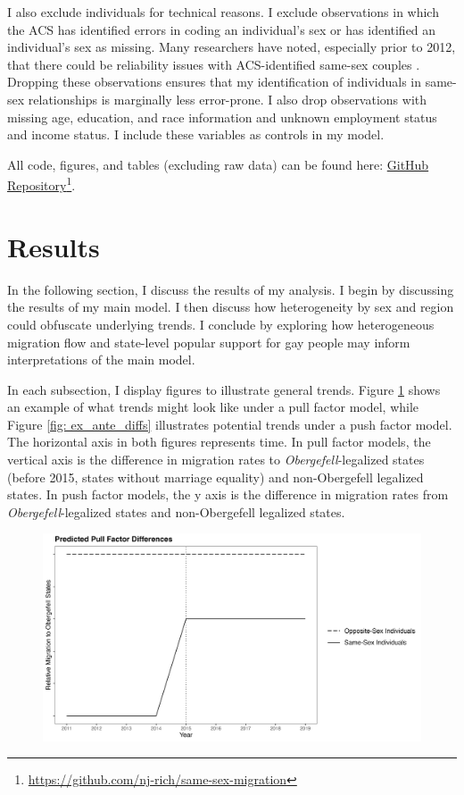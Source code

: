 \documentclass[12pt,letterpaper]{article}
\begin{document}
I also exclude individuals for technical reasons. I exclude observations in which the ACS has identified errors in coding an individual’s sex or has identified an individual’s sex as missing. Many researchers have noted, especially prior to 2012, that there could be reliability issues with ACS-identified same-sex couples \citep{3, 5, 7, 12}. Dropping these observations ensures that my identification of individuals in same-sex relationships is marginally less error-prone. I also drop observations with missing age, education, and race information and unknown employment status and income status. I include these variables as controls in my model.

All code, figures, and tables (excluding raw data) can be found here: \href{https://github.com/nj-rich/same-sex-migration}{GitHub Repository}\footnote{\url{https://github.com/nj-rich/same-sex-migration}}.

\FloatBarrier
\section{Results}
In the following section, I discuss the results of my analysis. I begin by discussing the results of my main model. I then discuss how heterogeneity by sex and region could obfuscate underlying trends. I conclude by exploring how heterogeneous migration flow and state-level popular support for gay people may inform interpretations of the main model.

In each subsection, I display figures to illustrate general trends. Figure \ref{fig: ex_post_diffs} shows an example of what trends might look like under a pull factor model, while Figure \ref{fig: ex_ante_diffs} illustrates potential trends under a push factor model.  The horizontal axis in both figures represents time. In pull factor models, the vertical axis is the difference in migration rates to \textit{Obergefell}-legalized states (before 2015, states without marriage equality) and non-Obergefell legalized states. In push factor models, the y axis is the difference in migration rates from \textit{Obergefell}-legalized states and non-Obergefell legalized states. 

\begin{figure}[htbp]
    \includegraphics[width=0.75\linewidth]{outputs/summary_stats/ex_post_diffs.png}
    \centering
    \caption{}
    \label{fig: ex_post_diffs}
\end{figure}
\end{document}
